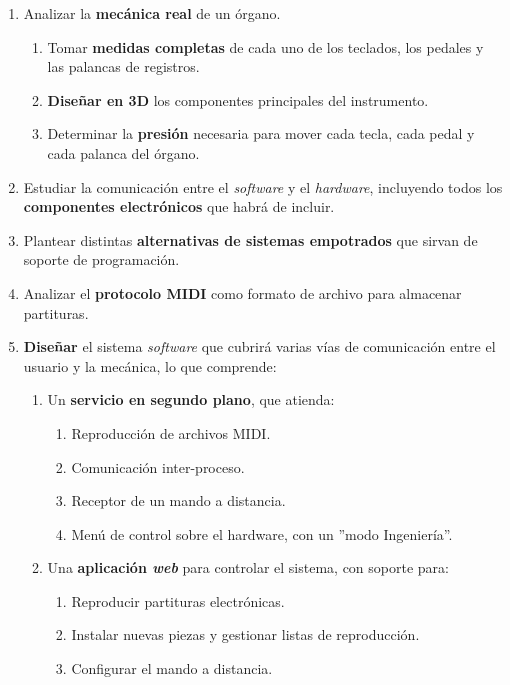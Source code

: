 \begin{enumerate}
	\item Analizar la \textbf{mecánica real} de un órgano.
	
	\begin{enumerate}
		\item Tomar \textbf{medidas completas} de cada uno de los teclados, los pedales y las palancas de registros.
		\item \textbf{Diseñar en 3D} los componentes principales del instrumento.
		\item Determinar la \textbf{presión} necesaria para mover cada tecla, cada pedal y cada palanca del órgano.
	\end{enumerate}
	
	\item Estudiar la comunicación entre el \textit{software} y el \textit{hardware}, incluyendo todos los \textbf{componentes electrónicos} que habrá de incluir.
	
	\item Plantear distintas \textbf{alternativas de sistemas empotrados} que sirvan de soporte de programación.
	
	\item Analizar el \textbf{protocolo \acrshort{MIDI}} como formato de archivo para almacenar partituras.
	
	\item \textbf{Diseñar} el sistema \textit{software} que cubrirá varias vías de comunicación entre el usuario y la mecánica, lo que comprende:
	
	\begin{enumerate}
		\item Un \textbf{servicio en segundo plano}, que atienda:
		
		\begin{enumerate}
			\item Reproducción de archivos \acrshort{MIDI}.
			\item Comunicación inter-proceso.
			\item Receptor de un mando a distancia.
			\item Menú de control sobre el hardware, con un ''modo Ingeniería''.
		\end{enumerate}
		
		\item Una \textbf{aplicación \textit{web}} para controlar el sistema, con soporte para:
		
		\begin{enumerate}
			\item Reproducir partituras electrónicas.
			\item Instalar nuevas piezas y gestionar listas de reproducción.
			\item Configurar el mando a distancia.
		\end{enumerate}
		

\end{enumerate}
\end{enumerate}
